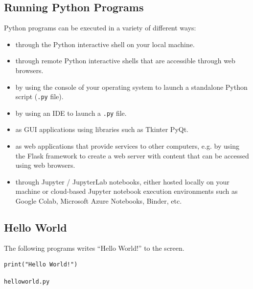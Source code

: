 \documentclass[a4paper,11pt]{article}
\newenvironment{code}{\captionsetup{type=listing}}{}
\begin{document}
\subsection{Running Python Programs}
Python programs can be executed in a variety of different ways:
\begin{itemize}
    \item   through the Python interactive shell on your local machine.
    \item   through remote Python interactive shells that are accessible through web browsers.
    \item   by using the console of your operating system to launch a standalone Python script (\verb|.py| file).
    \item   by using an IDE to launch a \verb|.py| file.
    \item   as GUI applications using libraries such as Tkinter PyQt.
    \item   as web applications that provide services to other computers, e.g. by using the Flask framework to create
            a web server with content that can be accessed using web browsers.
    \item   through Jupyter / JupyterLab notebooks, either hosted locally on your machine or cloud-based Jupyter
            notebook execution environments such as Google Colab, Microsoft Azure Notebooks, Binder, etc.
\end{itemize}

\subsection{Hello World}
The following programs writes ``Hello World!'' to the screen.
\begin{code}
\begin{verbatim}
print("Hello World!")
\end{verbatim}
\caption{\texttt{helloworld.py}}
\end{code}
\end{document}
